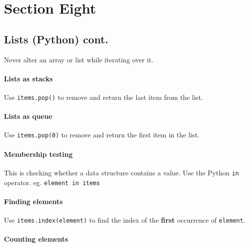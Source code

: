 \section{Section Eight}\label{sec:section_eight}

\subsection{Lists (Python) cont.}\label{sub:lists_python_cont_}

\begin{note}
    Never alter an array or list while iterating over it.
\end{note}

\paragraph{Lists as stacks}\label{par:lists_as_stacks}

Use \texttt{items.pop()} to remove and return the last item from the list.

\paragraph{Lists as queue}\label{par:lists_as_queue}

Use \texttt{items.pop(0)} to remove and return the first item in the list.

\paragraph{Membership testing}\label{par:membership_testing}

This is checking whether a data structure contains a value.
Use the Python \texttt{in} operator.
eg. \texttt{element in items}

\paragraph{Finding elements}\label{par:finding_elements}

Use \texttt{items.index(element)} to find the index of the \textbf{first} occurrence of \texttt{element}.

\paragraph{Counting elements}\label{par:counting_elements}

